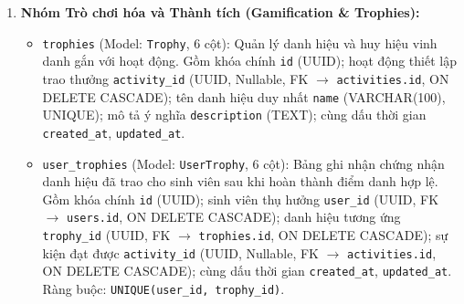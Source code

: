 \begin{enumerate}
    \item \textbf{Nhóm Trò chơi hóa và Thành tích (Gamification \& Trophies):}
    \begin{itemize}
        \item \texttt{trophies} (Model: \texttt{Trophy}, 6 cột): Quản lý danh hiệu và huy hiệu vinh danh gắn với hoạt động. Gồm khóa chính \texttt{id} (UUID); hoạt động thiết lập trao thưởng \texttt{activity\_id} (UUID, Nullable, FK $\rightarrow$ \texttt{activities.id}, ON DELETE CASCADE); tên danh hiệu duy nhất \texttt{name} (VARCHAR(100), UNIQUE); mô tả ý nghĩa \texttt{description} (TEXT); cùng dấu thời gian \texttt{created\_at}, \texttt{updated\_at}.
        \item \texttt{user\_trophies} (Model: \texttt{UserTrophy}, 6 cột): Bảng ghi nhận chứng nhận danh hiệu đã trao cho sinh viên sau khi hoàn thành điểm danh hợp lệ. Gồm khóa chính \texttt{id} (UUID); sinh viên thụ hưởng \texttt{user\_id} (UUID, FK $\rightarrow$ \texttt{users.id}, ON DELETE CASCADE); danh hiệu tương ứng \texttt{trophy\_id} (UUID, FK $\rightarrow$ \texttt{trophies.id}, ON DELETE CASCADE); sự kiện đạt được \texttt{activity\_id} (UUID, Nullable, FK $\rightarrow$ \texttt{activities.id}, ON DELETE CASCADE); cùng dấu thời gian \texttt{created\_at}, \texttt{updated\_at}. Ràng buộc: \texttt{UNIQUE(user\_id, trophy\_id)}.
    \end{itemize}


\end{enumerate}
